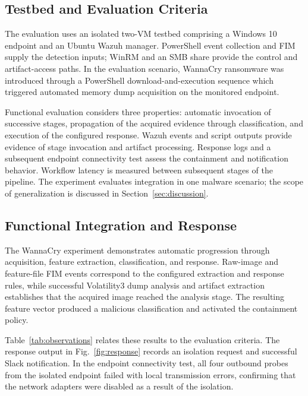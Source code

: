 \documentclass[conference]{IEEEtran}
\begin{document}
\subsection{Testbed and Evaluation Criteria}
The evaluation uses an isolated two-VM testbed comprising a Windows 10 endpoint and an Ubuntu Wazuh manager. PowerShell event collection and FIM supply the detection inputs; WinRM and an SMB share provide the control and artifact-access paths. In the evaluation scenario, WannaCry ransomware was introduced through a PowerShell download-and-execution sequence which triggered automated memory dump acquisition on the monitored endpoint.

Functional evaluation considers three properties: automatic invocation of successive stages, propagation of the acquired evidence through classification, and execution of the configured response. Wazuh events and script outputs provide evidence of stage invocation and artifact processing. Response logs and a subsequent endpoint connectivity test assess the containment and notification behavior. Workflow latency is measured between subsequent stages of the pipeline.
The experiment evaluates integration in one malware scenario; the scope of generalization is discussed in Section~\ref{sec:discussion}.

\subsection{Functional Integration and Response}
The WannaCry experiment demonstrates automatic progression through acquisition, feature extraction, classification, and response. Raw-image and feature-file FIM events correspond to the configured extraction and response rules, while successful Volatility3 dump analysis and artifact extraction establishes that the acquired image reached the analysis stage. The resulting feature vector produced a malicious classification and activated the containment policy.

Table~\ref{tab:observations} relates these results to the evaluation criteria. The response output in Fig.~\ref{fig:response} records an isolation request and successful Slack notification. In the endpoint connectivity test, all four outbound probes from the isolated endpoint failed with local transmission errors, confirming that the network adapters were disabled as a result of the isolation.
\end{document}

